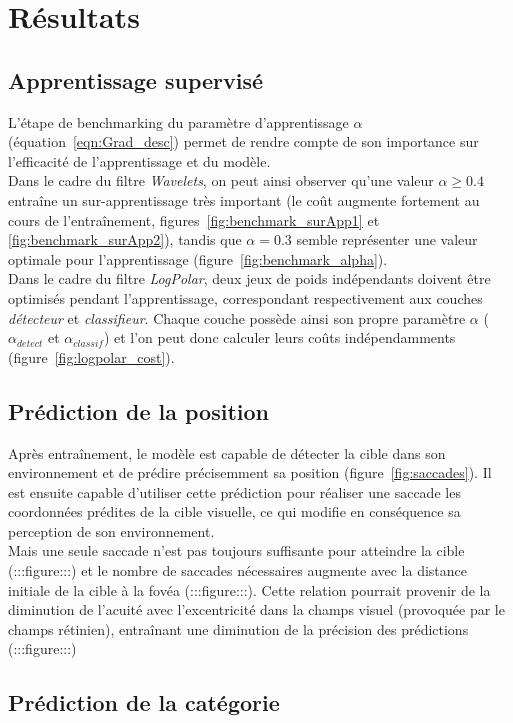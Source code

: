 
\chapter{Résultats} %
 
\label{Résultats} %


\section{Apprentissage supervisé}

L'étape de benchmarking du paramètre d'apprentissage $\alpha$ (équation~\ref{eqn:Grad_desc}) permet de rendre compte de son importance sur l'efficacité de l'apprentissage et du modèle. \\
Dans le cadre du filtre \textit{Wavelets}, on peut ainsi observer qu'une valeur $\alpha\geq0.4$ entraîne un sur-apprentissage très important (le coût augmente fortement au cours de l'entraînement, figures~\ref{fig:benchmark_surApp1} et \ref{fig:benchmark_surApp2}), tandis que $\alpha=0.3$ semble représenter une valeur optimale pour l'apprentissage (figure~\ref{fig:benchmark_alpha}).\\
Dans le cadre du filtre \textit{LogPolar}, deux jeux de poids indépendants doivent être optimisés pendant l'apprentissage,  correspondant respectivement aux couches \textit{détecteur} et \textit{classifieur}. Chaque couche possède ainsi son propre paramètre $\alpha$ ($\alpha_{detect}$ et $\alpha_{classif}$) et l'on peut donc calculer leurs coûts indépendamments (figure~\ref{fig:logpolar_cost}).


\section{Prédiction de la position}

Après entraînement, le modèle est capable de détecter la cible dans son environnement et de prédire précisemment sa position (figure~\ref{fig:saccades}). Il est ensuite capable d'utiliser cette prédiction pour réaliser une saccade les coordonnées prédites de la cible visuelle, ce qui modifie en conséquence sa perception de son environnement.\\
Mais une seule saccade n'est pas toujours suffisante pour atteindre la cible (:::figure:::) et le nombre de saccades nécessaires augmente avec la distance initiale de la cible à la fovéa (:::figure:::). Cette relation pourrait provenir de la diminution de l'acuité avec l'excentricité dans la champs visuel (provoquée par le champs rétinien), entraînant une diminution de la précision des prédictions (:::figure:::)


\section{Prédiction de la catégorie}

